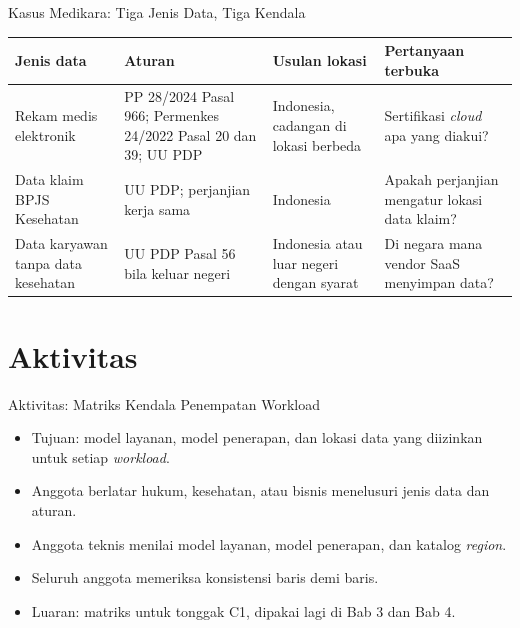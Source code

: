 \documentclass[aspectratio=169, table, 12pt]{beamer}
\begin{document}
\begin{frame}{Kasus Medikara: Tiga Jenis Data, Tiga Kendala}
  \footnotesize
  \begin{tabularx}{\textwidth}{>{\raggedright\arraybackslash}p{2.3cm}
      >{\raggedright\arraybackslash}X >{\raggedright\arraybackslash}p{2.8cm}
      >{\raggedright\arraybackslash}X}
    \hline
    \textbf{Jenis data} & \textbf{Aturan} & \textbf{Usulan lokasi} & \textbf{Pertanyaan
      terbuka} \\
    \hline
    Rekam medis elektronik & PP 28/2024 Pasal 966; Permenkes 24/2022 Pasal 20 dan 39; UU PDP &
      Indonesia, cadangan di lokasi berbeda & Sertifikasi \textit{cloud} apa yang diakui? \\
    \hline
    Data klaim BPJS Kesehatan & UU PDP; perjanjian kerja sama & Indonesia & Apakah perjanjian
      mengatur lokasi data klaim? \\
    \hline
    Data karyawan tanpa data kesehatan & UU PDP Pasal 56 bila keluar negeri & Indonesia atau luar negeri dengan
      syarat & Di negara mana vendor SaaS menyimpan data? \\
    \hline
  \end{tabularx}
\end{frame}

\section{Aktivitas}

\begin{frame}{Aktivitas: Matriks Kendala Penempatan Workload}
  \small
  \begin{itemize}
    \item Tujuan: model layanan, model penerapan, dan lokasi data yang diizinkan untuk setiap
          \textit{workload}.
    \item Anggota berlatar hukum, kesehatan, atau bisnis menelusuri jenis data dan aturan.
    \item Anggota teknis menilai model layanan, model penerapan, dan katalog \textit{region}.
    \item Seluruh anggota memeriksa konsistensi baris demi baris.
    \item Luaran: matriks untuk tonggak C1, dipakai lagi di Bab 3 dan Bab 4.
  \end{itemize}
\end{frame}
\end{document}
